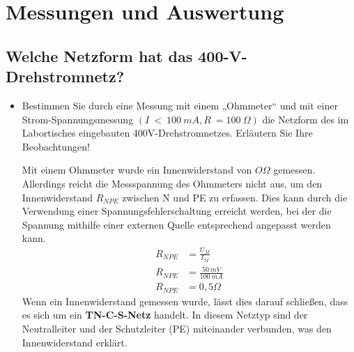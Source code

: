 \section{Messungen und Auswertung}

	\subsection{Welche Netzform hat das 400-V-Drehstromnetz?}
		\begin{itemize}
			\item Bestimmen Sie durch eine Messung mit einem „Ohmmeter“ und mit einer Strom-Spannungsmessung  $(I\ <\ 100\ mA, R\ = 100\ \Omega)$ die Netzform des im Labortisches eingebauten 400V-Drehstromnetzes. Erläutern Sie Ihre Beobachtungen! 
			
			Mit einem Ohmmeter wurde ein Innenwiderstand von $O \Omega$ gemessen. Allerdings reicht die Messspannung des Ohmmeters nicht aus, um den Innenwiderstand $R_{NPE}$ zwischen N und PE zu erfassen. Dies kann durch die Verwendung einer Spannungsfehlerschaltung erreicht werden, bei der die Spannung mithilfe einer externen Quelle entsprechend angepasst werden kann.
			\newline
			\begin{align*}
				R_{NPE} &= \frac{U_{M}}{I_{M}}\\
				R_{NPE} &= \frac{50\ mV}{100\ mA}\\
				R_{NPE} &= 0,5 \Omega
			\end{align*}
			Wenn ein Innenwiderstand gemessen wurde, lässt dies darauf schließen, dass es sich um ein \textbf{TN-C-S-Netz} handelt. In diesem Netztyp sind der Neutralleiter und der Schutzleiter (PE) miteinander verbunden, was den Innenwiderstand erklärt.
		\end{itemize}
		
		
